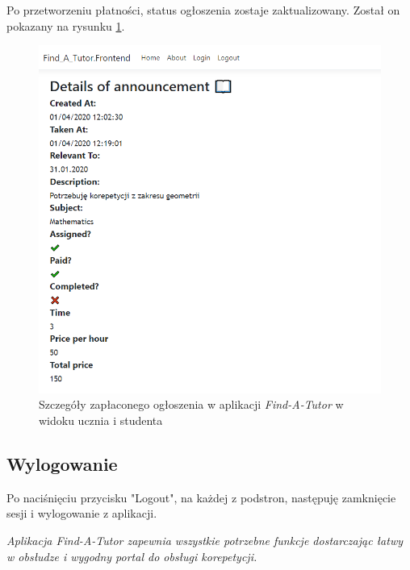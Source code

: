 \documentclass[12pt]{article}
\numberwithin{figure}{section}
\begin{document}
\begin{sloppypar}
Po przetworzeniu płatności, status ogłoszenia zostaje zaktualizowany. Został on pokazany na rysunku \ref{fig:details-paid}.
\begin{figure}[!htbp] 
    \centering
    \includegraphics[width=1\textwidth]{images/chapter_4/details-paid.png}
    \caption{Szczegóły zapłaconego ogłoszenia w aplikacji \textit{Find-A-Tutor} w widoku ucznia i studenta}
    \label{fig:details-paid}
\end{figure}

\subsection{Wylogowanie}
Po naciśnięciu przycisku "Logout", na każdej z podstron, następuję zamknięcie sesji i wylogowanie z aplikacji. \newline

\textit{Aplikacja Find-A-Tutor zapewnia wszystkie potrzebne funkcje dostarczając łatwy w obsłudze i wygodny portal do obsługi korepetycji.}

\pagebreak

\end{sloppypar}
\end{document}
